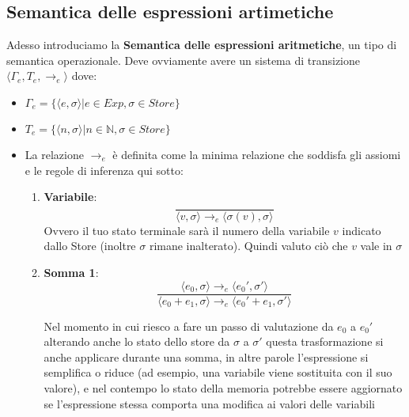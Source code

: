 \subsection{Semantica delle espressioni artimetiche}
Adesso introduciamo la \textbf{Semantica delle espressioni aritmetiche}, un tipo di semantica operazionale. Deve ovviamente avere un sistema di transizione $\langle \Gamma_e, T_e, \rightarrow_e \rangle$ dove:
\begin{itemize}
    \item $\Gamma_e = \{ \langle e, \sigma \rangle | e \in Exp, \sigma\in Store\}$
    \item $T_e = \{ \langle n, \sigma \rangle | n \in \mathbb{N}, \sigma\in Store\}$
    \item La relazione $\rightarrow_e$ è definita come la minima relazione che soddisfa gli assiomi e le regole di inferenza qui sotto:
    \begin{enumerate}
        \item \textbf{Variabile}:
        \[
        \frac{}{\langle v, \sigma \rangle \rightarrow_e \langle \sigma(v), \sigma \rangle}    
        \]
        Ovvero il tuo stato terminale sarà il numero della variabile $v$ indicato dallo Store (inoltre $\sigma$ rimane inalterato). Quindi valuto ciò che $v$ vale in $\sigma$
        \item \textbf{Somma 1}:
        \[
            \frac{\langle e_0, \sigma \rangle \rightarrow_e \langle e_0', \sigma' \rangle}{\langle e_0 + e_1, \sigma \rangle \rightarrow_e \langle e_0' + e_1, \sigma' \rangle}
        \]

        Nel momento in cui riesco a fare un passo di valutazione da $e_0$ a $e_0'$ alterando anche lo stato dello store da $\sigma$ a $\sigma'$ questa trasformazione si anche applicare durante una somma, in altre parole l’espressione si semplifica o riduce (ad esempio, una variabile viene sostituita con il suo valore), e nel contempo lo stato della memoria potrebbe essere aggiornato se l’espressione stessa comporta una modifica ai valori delle variabili


\end{enumerate}
\end{itemize}
